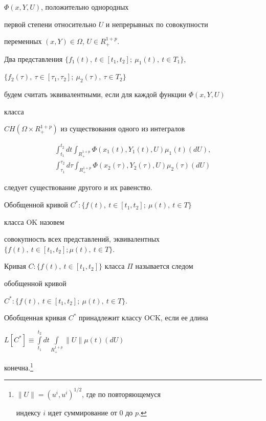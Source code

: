 $\Phi(x,Y,U)$, положительно однородных 


первой степени относительно $U$ и непрерывных по совокупности 


переменных $(x,Y)\in\Omega$, $U\in R^{1+p}_+$. 


 


Два представления $\{f_1(t),\ t\in[t_1,t_2];\ \mu_1(t),\ t\in T_1\}$, 


$\{f_2(\tau),\ \tau\in[\tau_1,\tau_2];\ \mu_2(\tau),\ \tau\in T_2\}$ 


будем считать эквивалентными, если для каждой функции $\Phi(x,Y,U)$ 


класса 


$CH(\Omega\times R^{1+p}_+)$ из существования одного из интегралов 


\begin{gather*} 


\int^{t_2}_{t_1}dt\int_{R^{1+p}_+} 


\Phi(x_1(t),Y_1(t),U)\mu_1(t)(d U),\\ 


\int^{\tau_2}_{\tau_1}d\tau\int_{R^{1+p}_+} 


\Phi(x_2(\tau),Y_2(\tau),U)\mu_2(\tau)(d U) 


\end{gather*} 


следует существование другого и их равенство. 


 


Обобщенной кривой $C^*:\{f(t),\ t\in[t_1,t_2];\ \mu(t),\ t\in T\}$ 


класса OK назовем 


совокупность всех представлений, эквивалентных $\{f(t),\ t\in[t_1,t_2]; 


\mu(t),\ t\in T\}$. 


Кривая $C:\{f(t),\ t\in[t_1,t_2]\}$ класса $\Pi$ называется следом 


обобщенной кривой 


$C^*:\{f(t),\ t\in[t_1,t_2];\ \mu(t),\ t\in T\}$. 


Обобщенная кривая $C^*$ принадлежит классу OCK, если ее длина 


$L[C^*]\equiv\int\limits^{t_2}_{t_1}dt\int\limits_{R^{1+p}_+} 


\|U\|\mu(t)(d{}U)$ 


конечна.\footnote{$\|U\|=(u^i,u^i)^{1/2}$, где по повторяющемуся 


индексу $i$ идет суммирование от 0 до $p$.} 



